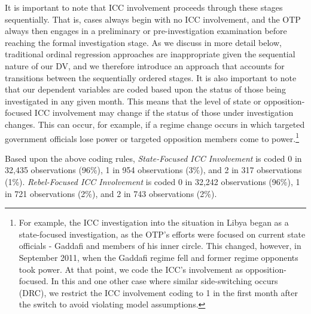 It is important to note that ICC involvement proceeds through these stages sequentially. That is, cases always begin with no ICC involvement, and the OTP always then engages in a preliminary or pre-investigation examination before reaching the formal investigation stage. As we discuss in more detail below, traditional ordinal regression approaches are inappropriate given the sequential nature of our DV, and we therefore introduce an approach that accounts for transitions between the sequentially ordered stages. It is also important to note that our dependent variables are coded based upon the status of those being investigated in any given month. This means that the level of state or opposition-focused ICC involvement may change if the status of those under investigation changes. This can occur, for example, if a regime change occurs in which targeted government officials lose power or targeted opposition members come to power.\footnote{For example, the ICC investigation into the situation in Libya began as a state-focused investigation, as the OTP's efforts were focused on current state officials - Gaddafi and members of his inner circle. This changed, however, in September 2011, when the Gaddafi regime fell and former regime opponents took power. At that point, we code the ICC's involvement as opposition-focused. In this and one other case where similar side-switching occurs (DRC), we restrict the ICC involvement coding to 1 in the first month after the switch to avoid violating model assumptions.}

Based upon the above coding rules, \emph{State-Focused ICC Involvement} is coded 0 in 32,435 observations (96\%), 1 in 954 observations (3\%), and 2 in 317 observations (1\%). \emph{Rebel-Focused ICC Involvement} is coded 0 in 32,242 observations (96\%), 1 in 721 observations (2\%), and 2 in 743 observations (2\%).

